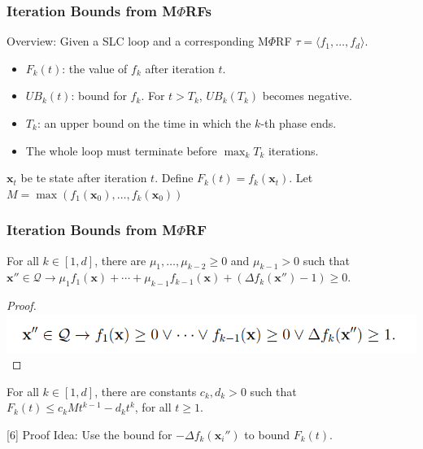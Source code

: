 \documentclass[11pt]{beamer}
\begin{document}
\begin{frame}\frametitle{Iteration Bounds from M$\Phi$RFs}
Overview:
Given a SLC loop and a corresponding M$\Phi$RF $\tau = \langle f_1, \ldots, f_d\rangle$.
\begin{itemize}
\item $F_k(t)$: the value of $f_k$ after iteration $t$.

\item $UB_k(t)$: bound for $f_k$. For $t > T_k$, $UB_k(T_k)$ becomes negative.

\item $T_k$: an upper bound on the time in which the $k$-th phase ends.

\item The whole loop must terminate before $\max_kT_k$ iterations.
\end{itemize}

$\textbf{x}_t$ be te state after iteration $t$. Define $F_k(t) = f_k(\textbf{x}_t)$. Let $M = \max(f_1(\textbf{x}_0), \ldots, f_k(\textbf{x}_0))$ 

\end{frame}


\begin{frame}\frametitle{Iteration Bounds from M$\Phi$RF}
\begin{lemma}[4]
For all $k \in [1, d]$, there are $\mu_1, \ldots, \mu_{k - 2} \ge 0$ and $\mu_{k - 1} > 0$ such that $\textbf{x}''\in \mathcal{Q}\rightarrow \mu_1f_1(\textbf{x}) + \cdots + \mu_{k - 1}f_{k-1}(\textbf{x}) + (\Delta f_k(\textbf{x}'') - 1) \ge 0$.
\end{lemma}
\begin{proof}
\includegraphics[scale=0.35]{13.png}
\end{proof}
\begin{lemma}[5]
For all $k \in [1, d]$, there are constants $c_k, d_k > 0$ such that $F_k(t) \le c_kMt^{k - 1}- d_kt^k$, for all $t \ge 1 $.
\end{lemma}[6]
Proof Idea: Use the bound for $-\Delta f_k(\textbf{x}_i '')$ to bound $F_k(t)$.
\end{frame}
\end{document}
